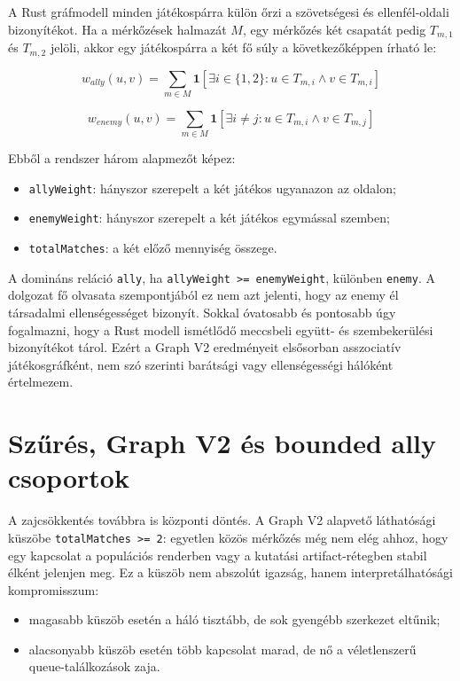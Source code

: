 ﻿\documentclass[a4paper,12pt]{report}
\begin{document}
A Rust gráfmodell minden játékospárra külön őrzi a szövetségesi és ellenfél-oldali bizonyítékot. Ha a mérkőzések halmazát $M$, egy mérkőzés két csapatát pedig $T_{m,1}$ és $T_{m,2}$ jelöli, akkor egy játékospárra a két fő súly a következőképpen írható le:

\begin{equation}
w_{ally}(u,v)=\sum_{m \in M}\mathbf{1}[\exists i \in \{1,2\}: u \in T_{m,i} \land v \in T_{m,i}]
\end{equation}

\begin{equation}
w_{enemy}(u,v)=\sum_{m \in M}\mathbf{1}[\exists i \neq j: u \in T_{m,i} \land v \in T_{m,j}]
\end{equation}

Ebből a rendszer három alapmezőt képez:

\begin{itemize}
    \item \texttt{allyWeight}: hányszor szerepelt a két játékos ugyanazon az oldalon;
    \item \texttt{enemyWeight}: hányszor szerepelt a két játékos egymással szemben;
    \item \texttt{totalMatches}: a két előző mennyiség összege.
\end{itemize}

A domináns reláció \texttt{ally}, ha \texttt{allyWeight >= enemyWeight}, különben \texttt{enemy}. A dolgozat fő olvasata szempontjából ez nem azt jelenti, hogy az enemy él társadalmi ellenségességet bizonyít. Sokkal óvatosabb és pontosabb úgy fogalmazni, hogy a Rust modell ismétlődő meccsbeli együtt- és szembekerülési bizonyítékot tárol. Ezért a Graph V2 eredményeit elsősorban asszociatív játékosgráfként, nem szó szerinti barátsági vagy ellenségességi hálóként értelmezem.

\section{Szűrés, Graph V2 és bounded ally csoportok}

A zajcsökkentés továbbra is központi döntés. A Graph V2 alapvető láthatósági küszöbe \texttt{totalMatches >= 2}: egyetlen közös mérkőzés még nem elég ahhoz, hogy egy kapcsolat a populációs renderben vagy a kutatási artifact-rétegben stabil élként jelenjen meg. Ez a küszöb nem abszolút igazság, hanem interpretálhatósági kompromisszum:

\begin{itemize}
    \item magasabb küszöb esetén a háló tisztább, de sok gyengébb szerkezet eltűnik;
    \item alacsonyabb küszöb esetén több kapcsolat marad, de nő a véletlenszerű queue-találkozások zaja.
\end{itemize}
\end{document}
